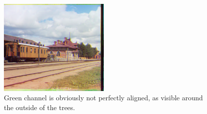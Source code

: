 \begin{figure}[h]
	\centering
	\includegraphics[width=0.48\textwidth]{figures/00398_v2.png} 

	\caption{Green channel is obviously not perfectly aligned, as visible around the outside of the trees. }
	\label{fig:a1:imperfect}
\end{figure}





